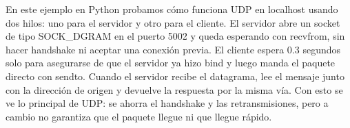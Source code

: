 En este ejemplo en Python probamos cómo funciona UDP en localhost usando dos hilos: uno para el servidor y otro para el cliente.
El servidor abre un socket de tipo SOCK\_DGRAM en el puerto 5002 y queda esperando con recvfrom, sin hacer handshake ni aceptar una conexión previa.
El cliente espera 0.3 segundos solo para asegurarse de que el servidor ya hizo bind y luego manda el paquete directo con sendto.
Cuando el servidor recibe el datagrama, lee el mensaje junto con la dirección de origen y devuelve la respuesta por la misma vía.
Con esto se ve lo principal de UDP: se ahorra el handshake y las retransmisiones, pero a cambio no garantiza que el paquete llegue ni que llegue rápido.